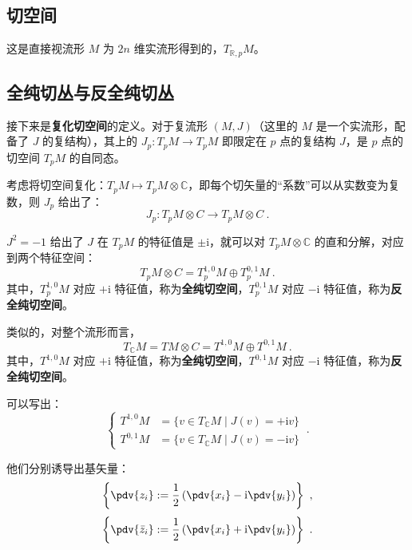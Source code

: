 

\subsection{切空间}
这是直接视流形 $M$ 为 $2n$ 维实流形得到的，$T_{\mathbb R, p} M$。

\subsection{全纯切丛与反全纯切丛}
接下来是\textbf{复化切空间}的定义。对于复流形 $(M, J)$（这里的 $M$ 是一个实流形，配备了 $J$ 的复结构），其上的 $J_p: T_p M \to T_p M$ 即限定在 $p$ 点的复结构 $J$，是 $p$ 点的切空间 $T_p M$ 的自同态。

考虑将切空间复化：$T_p M \mapsto T_p M \otimes \mathbb C$，即每个切矢量的“系数”可以从实数变为复数，则 $J_p$ 给出了：
\begin{equation}
J_p : T_p M \otimes C \to T_p M \otimes C ~.
\end{equation}

$J^2 = -1$ 给出了 $J$ 在 $T_p M$ 的特征值是 $\pm \mathrm i$，就可以对 $T_p M \otimes \mathbb C$ 的直和分解，对应到两个特征空间：
\begin{equation}
T_p M \otimes C = T_p^{1, 0} M \oplus T_p^{0, 1} M ~.
\end{equation}
其中，$T_p^{1, 0} M$ 对应 $+\mathrm i$ 特征值，称为\textbf{全纯切空间}，$T_p^{0, 1} M$ 对应 $-\mathrm i$ 特征值，称为\textbf{反全纯切空间}。


类似的，对整个流形而言，
\begin{equation}
T_{\mathbb C} M = TM \otimes C = T^{1, 0} M \oplus T^{0, 1} M ~.
\end{equation}
其中，$T^{1, 0} M$ 对应 $+\mathrm i$ 特征值，称为\textbf{全纯切空间}，$T^{0, 1} M$ 对应 $-\mathrm i$ 特征值，称为\textbf{反全纯切空间}。

可以写出：
\begin{equation}
\left\{\begin{aligned}
T^{1, 0} M &= \{v \in T_{\mathbb C} M \mid J(v) = +\mathrm i v\} \\
T^{0, 1} M &= \{v \in T_{\mathbb C} M \mid J(v) = -\mathrm i v\} 
\end{aligned}\right. ~.
\end{equation}

他们分别诱导出基矢量：
\begin{equation}
\left\{ \pdv{z_i} := \frac{1}{2} \left( \pdv{x_i} - \mathrm i \pdv{y_i} \right) \right\} ~,
\end{equation}
\begin{equation} 
\left\{ \pdv{\bar z_i} := \frac{1}{2} \left( \pdv{x_i} + \mathrm i \pdv{y_i} \right)\right\} ~.
\end{equation}

